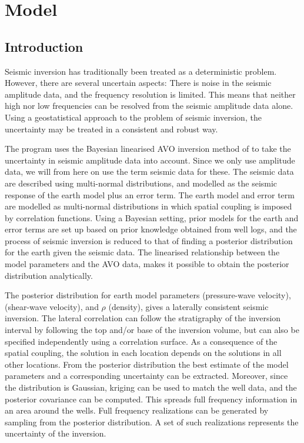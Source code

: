\chapter{Model}
\label{sec:theory}

\section{Introduction}
Seismic inversion has traditionally been treated as a deterministic
problem. However, there are several uncertain aspects: There is noise
in the seismic amplitude data, and the frequency resolution is
limited. This means that neither high nor low frequencies can be resolved from the
seismic amplitude data alone. Using a geostatistical approach to the problem of
seismic inversion, the uncertainty may be treated in a consistent and
robust way.

The \crava program uses the Bayesian linearised AVO inversion method
of \cite{geo68ab2} to take the uncertainty in seismic amplitude data
into account. Since we only use amplitude data, we will from here on
use the term seismic data for these. The seismic data are 
described using multi-normal distributions, and modelled as the seismic
response of the earth model plus an error term. The earth model and
error term are modelled as multi-normal distributions in which spatial
coupling is imposed by correlation functions. Using a Bayesian
setting, prior models for the earth and error terms are set up based
on prior knowledge obtained from well logs, and the process of seismic
inversion is reduced to that of finding a posterior distribution for
the earth given the seismic data. The linearised relationship between
the model parameters and the AVO data, makes it possible to obtain the
posterior distribution analytically.

The posterior distribution for earth model parameters \vp
(pressure-wave velocity), \vs (shear-wave velocity), and $\rho$
(density), gives a laterally consistent seismic inversion. The lateral
correlation can follow the stratigraphy of the inversion interval by
following the top and/or base of the inversion volume, but can also be
specified independently using a correlation surface. As a consequence
of the spatial coupling, the solution in each location depends on the
solutions in all other locations. From the posterior distribution the
best estimate of the model parameters and a corresponding uncertainty
can be extracted. Moreover, since the distribution is Gaussian, kriging
can be used to match the well data, and the posterior covariance can
be computed. This spreads full frequency information in an area around
the wells. Full frequency realizations can be generated by sampling
from the posterior distribution. A set of such realizations represents
the uncertainty of the inversion. 

